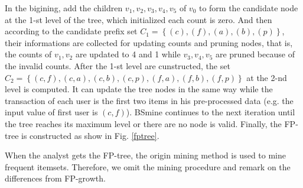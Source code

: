 \documentclass[conference]{IEEEtran}
\begin{document}
In the bigining, add the children $v_1,v_2,v_3,v_4,v_5$ of $v_0$ to form the candidate node at the 1-st level of the tree, which initialized each count is zero. And then according to the candidate prefix set $C_1 = \left\{ (c),(f),(a),(b),(p) \right\}$, their informations are collected for updating counts and pruning nodes, that is, the counts of $v_1,v_2$ are updated to 4 and 1 while $v_3,v_4,v_5$ are pruned because of the invalid counts. After the 1-st level are cunstructed, the set $C_2 = \left\{ (c,f),(c,a),(c,b),(c,p),(f,a),(f,b),(f,p) \right\}$ at the 2-nd level is computed. It can update the tree nodes in the same way while the transaction of each user is the first two items in his pre-processed data (e.g. the input value of first user  is $(c,f)$). BSmine continues to the next iteration until the tree reaches its maximum level or there are no node is valid. Finally, the FP-tree is constructed as show in Fig. \ref{fptree}.

When the analyst gets the FP-tree, the origin mining method is used to mine frequent itemsets. Therefore, we omit the mining procedure and remark on the differences from FP-growth. 
\end{document}
